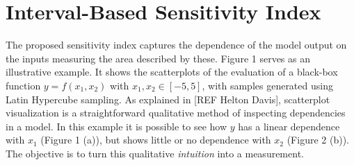 \documentclass[twocolumn]{rps-esrel2022}
\begin{document}
\section{Interval-Based Sensitivity Index}

The proposed sensitivity index captures the dependence of the model output on the inputs measuring the area described by these. %
Figure 1 serves as an illustrative example.
It shows the scatterplots of the evaluation of a black-box function $y = f(x_1,x_2)$ with $x_1,x_2 \in [-5,5]$, with samples generated using Latin Hypercube sampling.
As explained in [REF Helton Davis], scatterplot visualization is a straightforward qualitative method of inspecting dependencies in a model.
In this example it is possible to see how $y$ has a linear dependence with $x_1$ (Figure 1 (a)), but shows little or no dependence with $x_2$ (Figure 2 (b)).
The objective is to turn this qualitative \textit{intuition} into a measurement.
\end{document}
